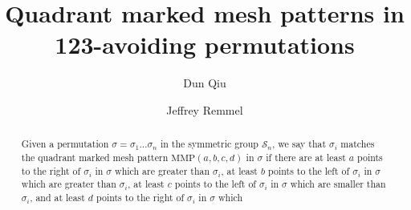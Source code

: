 \documentclass[
final,nomarks
]{dmtcs-episciences}
\author{Dun Qiu
  \and Jeffrey Remmel}
\title{Quadrant marked mesh patterns in 123-avoiding permutations}
\affiliation{
  Department of Mathematics, University of California San Diego, La Jolla, USA}
\begin{document}
\maketitle
\begin{abstract}
Given a permutation \begin{math}\sigma = \sigma_1 \ldots \sigma_n\end{math} in the symmetric group 
\begin{math}\mathcal{S}_{n}\end{math}, we say that \begin{math}\sigma_i\end{math} matches the quadrant marked mesh pattern 
\begin{math}\mathrm{MMP}(a,b,c,d)\end{math} in \begin{math}\sigma\end{math} if there are at least 
\begin{math}a\end{math} points to the right of \begin{math}\sigma_i\end{math} in \begin{math}\sigma\end{math} which are greater than 
\begin{math}\sigma_i\end{math}, at least \begin{math}b\end{math} points to the left of \begin{math}\sigma_i\end{math} in \begin{math}\sigma\end{math} which 
are greater than \begin{math}\sigma_i\end{math},  at least \begin{math}c\end{math} points to the left of 
\begin{math}\sigma_i\end{math} in \begin{math}\sigma\end{math} which are smaller  than \begin{math}\sigma_i\end{math}, and 
at least \begin{math}d\end{math} points to the right of \begin{math}\sigma_i\end{math} in \begin{math}\sigma\end{math} which 

\end{abstract}
\end{document}
